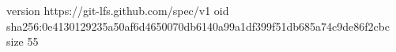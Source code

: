 version https://git-lfs.github.com/spec/v1
oid sha256:0e4130129235a50af6d4650070db6140a99a1df399f51db685a74c9de86f2cbc
size 55
